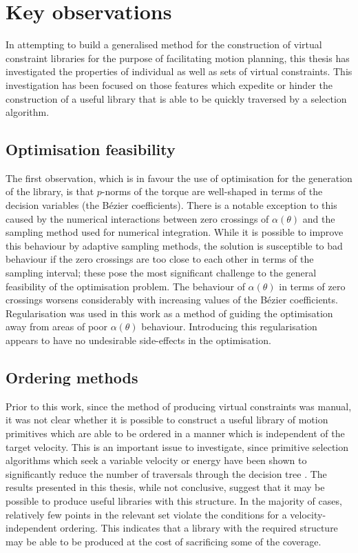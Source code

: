 \section{Key observations}
In attempting to build a generalised method for the construction of virtual constraint libraries for the purpose of facilitating motion planning, this thesis has investigated the properties of individual as well as sets of virtual constraints. This investigation has been focused on those features which expedite or hinder the construction of a useful library that is able to be quickly traversed by a selection algorithm.

\subsection{Optimisation feasibility}
The first observation, which is in favour the use of optimisation for the generation of the library, is that $p$-norms of the torque are well-shaped in terms of the decision variables (the Bézier coefficients). There is a notable exception to this caused by the numerical interactions between zero crossings of $\alpha(\theta)$ and the sampling method used for numerical integration. While it is possible to improve this behaviour by adaptive sampling methods, the solution is susceptible to bad behaviour if the zero crossings are too close to each other in terms of the sampling interval; these pose the most significant challenge to the general feasibility of the optimisation problem. The behaviour of $\alpha(\theta)$ in terms of zero crossings worsens considerably with increasing values of the Bézier coefficients. Regularisation was used in this work as a method of guiding the optimisation away from areas of poor $\alpha(\theta)$ behaviour. Introducing this regularisation appears to have no undesirable side-effects in the optimisation.

\subsection{Ordering methods}
Prior to this work, since the method of producing virtual constraints was manual, it was not clear whether it is possible to construct a useful library of motion primitives which are able to be ordered in a manner which is independent of the target velocity. This is an important issue to investigate, since primitive selection algorithms which seek a variable velocity or energy have been shown to significantly reduce the number of traversals through the decision tree \cite{manchester13planning}. The results presented in this thesis, while not conclusive, suggest that it may be possible to produce useful libraries with this structure. In the majority of cases, relatively few points in the relevant set violate the conditions for a velocity-independent ordering. This indicates that a library with the required structure may be able to be produced at the cost of sacrificing some of the coverage.

